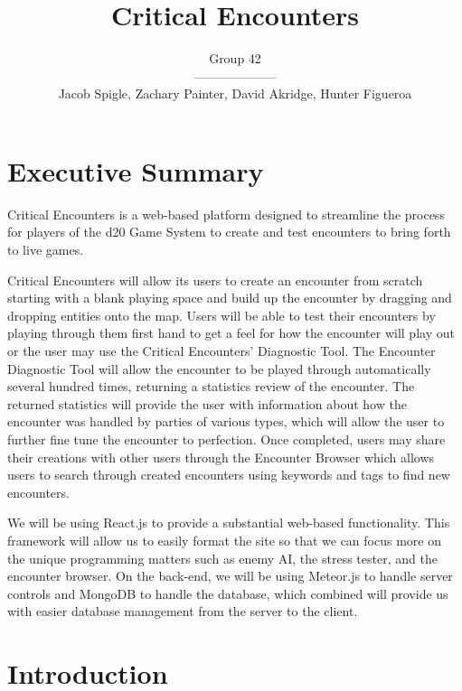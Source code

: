 \documentclass[12pt,a4paper]{report}
\author{Group 42 \\ -------------------- \\Jacob Spigle, Zachary Painter, David Akridge, Hunter Figueroa}
\title{Critical Encounters}
\begin{document}
	
\maketitle

\tableofcontents


	
\newpage

\chapter*{Executive Summary}

Critical Encounters is a web-based platform designed to streamline the process for players of the d20 Game System to create and test encounters to bring forth to live games. 

Critical Encounters will allow its users to create an encounter from scratch starting with a blank playing space and build up the encounter by dragging and dropping entities onto the map. Users will be able to test their encounters by playing through them first hand to get a feel for how the encounter will play out or the user may use the Critical Encounters' Diagnostic Tool. The Encounter Diagnostic Tool will allow the encounter to be played through automatically several hundred times, returning a statistics review of the encounter. The returned statistics will provide the user with information about how the encounter was handled by parties of various types, which will allow the user to further fine tune the encounter to perfection. Once completed, users may share their creations with other users through the Encounter Browser which allows users to search through created encounters using keywords and tags to find new encounters. 

We will be using React.js to provide a substantial web-based functionality. This framework will allow us to easily format the site so that we can focus more on the unique programming matters such as enemy AI, the stress tester, and the encounter browser. On the back-end, we will be using Meteor.js to handle server controls and MongoDB to handle the database, which combined will provide us with easier database management from the server to the client. 

\newpage
\chapter*{Introduction}
\end{document}
